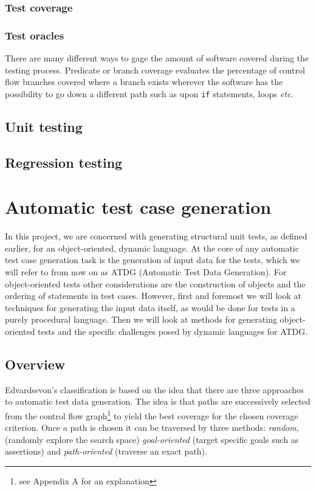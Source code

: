 \documentclass[a4paper,11pt,titlepage]{report}
\begin{document}
\subsubsection{Test coverage}
\subsubsection{Test oracles}

There are many different ways to gage the amount of software covered during the testing process. Predicate or branch coverage evaluates the percentage of control flow branches covered where a branch exists wherever the software has the possibility to go down a different path such as upon \texttt{if} statements, loops \emph{etc.}

\subsection{Unit testing}
\subsection{Regression testing}

\section{Automatic test case generation}
In this project, we are concerned with generating structural unit tests, as defined earlier, for an object-oriented, dynamic language. At the core of any automatic test case generation task is the generation of input data for the tests, which we will refer to from now on as ATDG (Automatic Test Data Generation). For object-oriented tests other considerations are the construction of objects and the ordering of statements in test cases. However, first and foremost we will look at techniques for generating the input data itself, as would be done for tests in a purely procedural language. Then we will look at methods for generating object-oriented tests and the specific challenges posed by dynamic languages for ATDG.

\subsection{Overview}
Edvardssvon's classification \cite{edvardsson1999survey} is based on the idea that there are three approaches to automatic test data generation. The idea is that paths are successively selected from the control flow graph\footnote{see Appendix A for an explanation} to yield the best coverage for the chosen coverage criterion. Once a path is chosen it can be traversed by three methods: \emph{random}, (randomly explore the search space) \emph{goal-oriented} (target specific goals such as assertions) and \emph{path-oriented} (traverse an exact path). 
\end{document}
